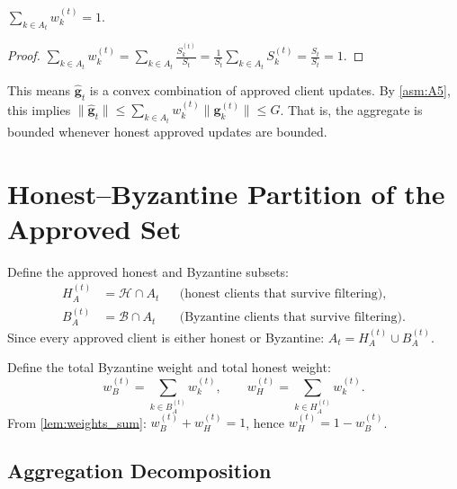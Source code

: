 \documentclass[../main]{subfiles}
\begin{document}
\begin{lemma}
\hfill \\\label{lem:weights_sum}
\hfill \\
$\displaystyle\sum_{k \in A_t} w_k^{(t)} = 1$.
\end{lemma}

\begin{proof}
$\displaystyle\sum_{k \in A_t} w_k^{(t)} = \sum_{k \in A_t} \frac{S_k^{(t)}}{S_t}
= \frac{1}{S_t} \sum_{k \in A_t} S_k^{(t)} = \frac{S_t}{S_t} = 1$.
\end{proof}

\begin{remark}
This means $\hat{\mathbf{g}}_t$ is a convex combination of approved client updates.
By \cref{asm:A5}, this implies $\|\hat{\mathbf{g}}_t\| \leq \sum_{k \in A_t} w_k^{(t)} \|\mathbf{g}_k^{(t)}\| \leq G$. That is, the aggregate is bounded whenever honest approved updates are bounded.
\end{remark}

\section{Honest--Byzantine Partition of the Approved Set}
\label{app:partition}

Define the approved honest and Byzantine subsets:
\begin{align}
    H_A^{(t)} &= \mathcal{H} \cap A_t &&\text{(honest clients that survive filtering)},
    \label{eq:honest_approved}\\
    B_A^{(t)} &= \mathcal{B} \cap A_t &&\text{(Byzantine clients that survive filtering)}.
    \label{eq:byz_approved}
\end{align}
Since every approved client is either honest or Byzantine:
$A_t = H_A^{(t)} \cup B_A^{(t)}$.

Define the total Byzantine weight and total honest weight:
\begin{equation}
    w_B^{(t)} = \sum_{k \in B_A^{(t)}} w_k^{(t)}, \qquad
    w_H^{(t)} = \sum_{k \in H_A^{(t)}} w_k^{(t)}.
    \label{eq:weight_partition}
\end{equation}
From \cref{lem:weights_sum}: $w_B^{(t)} + w_H^{(t)} = 1$, hence
$w_H^{(t)} = 1 - w_B^{(t)}$.

\subsection{Aggregation Decomposition}
\end{document}
